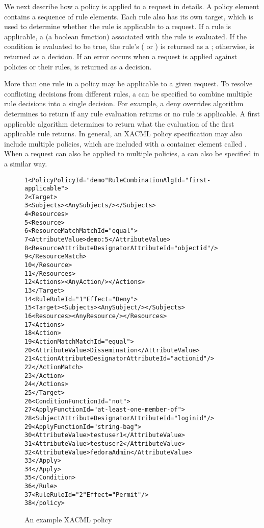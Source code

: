 We next describe how a policy is applied to a request in details. A
policy element contains a sequence of rule elements. Each rule also
has its own target, which is used to determine whether the rule is
applicable to a request. If a rule is applicable, a
 (a boolean function) associated with the rule is
evaluated. If the condition is evaluated to be true, the rule's
 ( or ) is returned as a
; otherwise,  is returned as a
decision. If an error occurs when a request is applied against
policies or their rules,  is returned as a
decision.

More than one rule in a policy may be applicable to a given request.
To resolve conflicting decisions from different rules, a  can be specified to combine multiple rule
decisions into a single decision. For example, a deny overrides
algorithm determines to return  if any rule evaluation
returns  or no rule is applicable. A first applicable
algorithm determines to return what the evaluation of the first
applicable rule returns. In general, an XACML policy specification
may also include multiple policies, which are included with a
container element called . When a request can also
be applied to multiple policies, a  can also be specified in a similar way.

\begin{figure}[t]
\begin{CodeOut}
\begin{alltt}
 1<Policy PolicyId="demo" RuleCombinationAlgId="first-applicable">
 2 <Target>
 3   <Subjects> <AnySubjects/> </Subjects>
 4   <Resources>
 5    <Resource>
 6     <ResourceMatch MatchId="equal">
 7      <AttributeValue>demo:5</AttributeValue>
 8      <ResourceAttributeDesignator AttributeId="objectid"/>
 9     </ResourceMatch>
10    </Resource>
11   </Resources>
12   <Actions> <AnyAction/></Actions>
13 </Target>
14 <Rule RuleId="1" Effect="Deny">
15  <Target> <Subjects><AnySubject/></Subjects>
16   <Resources> <AnyResource/> </Resources>
17   <Actions>
18    <Action>
19     <ActionMatch MatchId="equal">
20      <AttributeValue>Dissemination</AttributeValue>
21      <ActionAttributeDesignator AttributeId="actionid"/>
22     </ActionMatch>
23    </Action>
24   </Actions>
25  </Target>
26  <Condition FunctionId="not">
27   <Apply FunctionId="at-least-one-member-of">
28    <SubjectAttributeDesignator AttributeId="loginid"/>
29    <Apply FunctionId="string-bag">
30     <AttributeValue>testuser1</AttributeValue>
31     <AttributeValue>testuser2</AttributeValue>
32     <AttributeValue>fedoraAdmin</AttributeValue>
33    </Apply>
34   </Apply>
35  </Condition>
36 </Rule>
37 <Rule RuleId="2" Effect="Permit"/>
38</policy>
\end{alltt}
\end{CodeOut}
\caption{An example XACML policy}
 \label{fig:example}
\end{figure}

